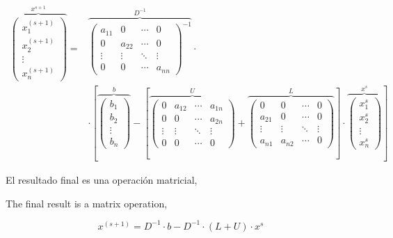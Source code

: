  \begin{align*}
 \overbrace{\begin{pmatrix}
x_1^{(s+1)}\\
x_2^{(s+1)}\\
\vdots \\
x_n^{(s+1)}
\end{pmatrix}}^{x^{s+1}}= &
\overbrace{\begin{pmatrix}
a_{11}& 0& \cdots & 0\\
0& a_{22}& \cdots & 0\\
\vdots & \vdots & \ddots & \vdots\\
0& 0& \cdots & a_{nn}
\end{pmatrix}^{-1}}^{D^{-1}} \cdot\\
&\cdot \left[ \overbrace{\begin{pmatrix}
b_1\\
b_2\\
\vdots \\
b_n
\end{pmatrix}}^b- \left[\overbrace{\begin{pmatrix}
0& a_{12}& \cdots & a_{1n}\\
0& 0& \cdots & a_{2n}\\
\vdots & \vdots & \ddots & \vdots\\
0& 0& \cdots & 0
\end{pmatrix}}^U+
\overbrace{\begin{pmatrix}
0& 0& \cdots & 0\\
a_{21}& 0& \cdots & 0\\
\vdots & \vdots & \ddots & \vdots\\
a_{n1}& a_{n2}& \cdots & 0
\end{pmatrix}}^L \right] \cdot \overbrace{\begin{pmatrix}
x_1^s\\
x_2^s\\
\vdots \\
x_n^s
\end{pmatrix}}^{x^s}\right]  
\end{align*}

\begin{paracol}{2}

El resultado final es una operación matricial,

\switchcolumn
The final result is a matrix operation,
\end{paracol}

\begin{equation*}
x^{(s+1)}=D^{-1}\cdot b- D^{-1}\cdot\left(L+U\right)\cdot x^s
\end{equation*}

